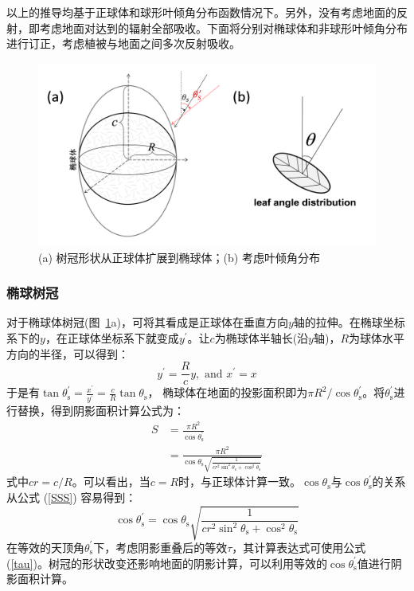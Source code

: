 以上的推导均基于正球体和球形叶倾角分布函数情况下。另外，没有考虑地面的反射，即考虑地面对达到的辐射全部吸收。下面将分别对椭球体和非球形叶倾角分布进行订正，考虑植被与地面之间多次反射吸收。

{
  \begin{figure}[htbp]
    \centering
    \includegraphics[width=0.8\columnwidth]{Figures/辐射过程及辐射通量计算/椭球体树冠.png}
    \caption{(a) 树冠形状从正球体扩展到椭球体；(b) 考虑叶倾角分布}
    \label{fig:椭球体树冠}
  \end{figure}
}

\subsubsection{椭球树冠}

对于椭球体树冠(图~\ref{fig:椭球体树冠}a)，可将其看成是正球体在垂直方向$y$轴的拉伸。在椭球坐标系下的$y$，在正球体坐标系下就变成$y^\prime$。让$c$为椭球体半轴长(沿$y$轴)，$R$为球体水平方向的半径，可以得到：
\begin{equation}
  y^{\prime}=\frac{R}{c} y, \text { and } x^{\prime}=x
\end{equation}
于是有$\tan{\theta_{\mathrm s}^\prime}=\frac{x^\prime}{y^\prime}=\frac{c}{R}{\tan{\theta}}_{\mathrm s}$，
椭球体在地面的投影面积即为$\pi R^2/\cos{\theta_{\mathrm s}^\prime}$。将$\theta_{\mathrm s}^\prime$进行替换，得到阴影面积计算公式为：
\begin{equation}\label{SSS}
  \begin{aligned} S &=\frac{\pi R^{2}}{\cos \theta_{\mathrm{s}}^{\prime}} \\ &=\frac{\pi R^{2}}{\cos \theta_{\mathrm{s}}
  \sqrt{\frac{1}{c r^{2} \sin ^{2} \theta_{\mathrm{s}}+\cos ^{2} \theta_{\mathrm{s}}}}} \end{aligned}
\end{equation}
式中$cr=c/R$。可以看出，当$c=R$时，与正球体计算一致。$\cos{\theta_{\mathrm s}}$与$\cos{\theta_{\mathrm s}^\prime}$的关系从公式 (\ref{SSS}) 容易得到：
%
\begin{equation}
  \cos{\theta_{\mathrm s}^\prime}=\cos{\theta_{\mathrm s}}\sqrt{\frac{1}{{cr}^2\sin^2{\theta_{\mathrm s}}+\cos^2{\theta_{\mathrm s}}}}
\end{equation}
%
在等效的天顶角$\theta_{\mathrm s}^\prime$下，考虑阴影重叠后的等效$\tau$，其计算表达式可使用公式(\ref{tau})。树冠的形状改变还影响地面的阴影计算，可以利用等效的$\cos{\theta_{\mathrm s}^\prime}$值进行阴影面积计算。

